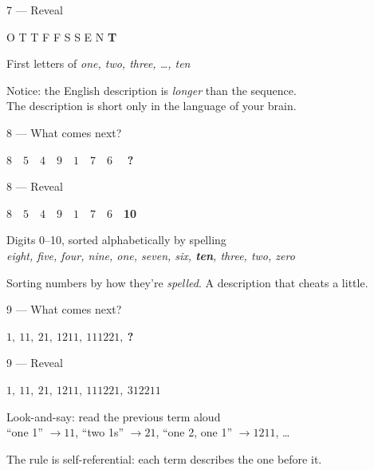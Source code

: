 \documentclass[aspectratio=169, 12pt, xcolor={dvipsnames}]{beamer}
\newcommand{\seq}[1]{{\huge\ttfamily #1}}
\newcommand{\seqtight}[1]{{\Large\ttfamily #1}}
\newcommand{\blank}{\textcolor{accent}{\textbf{?}}}
\newcommand{\ans}[1]{\textcolor{accent}{\textbf{#1}}}
\newcommand{\hintline}[1]{\vfill\begin{center}\small\textcolor{hint}{#1}\end{center}}
\begin{document}
\begin{frame}{7 --- Reveal}
\vfill
\begin{center}\seq{O \quad T \quad T \quad F \quad F \quad S \quad S \quad E \quad N \quad \ans{T}}\end{center}
\vfill
\begin{center}\Large First letters of \emph{one, two, three, \ldots, ten}\end{center}
\hintline{Notice: the English description is \emph{longer} than the sequence.\\
The description is short only in the language of your brain.}
\end{frame}

\begin{frame}{8 --- What comes next?}
\vfill
\begin{center}\seq{$8 \quad 5 \quad 4 \quad 9 \quad 1 \quad 7 \quad 6 \quad$ \blank}\end{center}
\vfill
\end{frame}

\begin{frame}{8 --- Reveal}
\vfill
\begin{center}\seq{$8 \quad 5 \quad 4 \quad 9 \quad 1 \quad 7 \quad 6 \quad $\ans{10}}\end{center}
\vfill
\begin{center}
\Large Digits 0--10, sorted alphabetically by spelling\\[0.3em]
\small \emph{eight, five, four, nine, one, seven, six, \textbf{ten}, three, two, zero}
\end{center}
\hintline{Sorting numbers by how they're \emph{spelled}. A description that cheats a little.}
\end{frame}

\begin{frame}{9 --- What comes next?}
\vfill
\begin{center}\seqtight{$1,\ 11,\ 21,\ 1211,\ 111221,\ $\blank}\end{center}
\vfill
\end{frame}

\begin{frame}{9 --- Reveal}
\vfill
\begin{center}\seqtight{$1,\ 11,\ 21,\ 1211,\ 111221,\ $\ans{$312211$}}\end{center}
\vfill
\begin{center}
\Large Look-and-say: read the previous term aloud\\[0.3em]
\small ``one 1'' $\to 11$, \quad ``two 1s'' $\to 21$, \quad ``one 2, one 1'' $\to 1211$, \ldots
\end{center}
\hintline{The rule is self-referential: each term describes the one before it.}
\end{frame}
\end{document}

